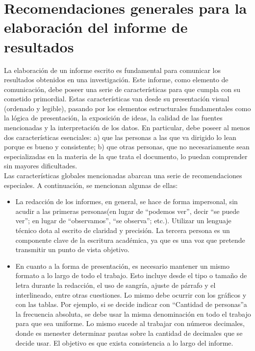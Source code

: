 \documentclass{../prob}
\begin{document}
\newpage

\section*{Recomendaciones generales para la elaboración del informe de resultados}
La  elaboración  de  un informe  escrito  es  fundamental  para  comunicar  los  resultados obtenidos  en  una  investigación. Este  informe, como  elemento  de  comunicación, debe poseer una serie de características para que cumpla con su cometido primordial. Estas características van   desde   su   presentación   visual   (ordenado   y   legible),   pasando   por   los   elementos estructurales fundamentales como la lógica  de presentación, la exposición de ideas, la calidad de  las  fuentes  mencionadas  y  la  interpretación  de  los  datos. En  particular, debe  poseer  al menos dos características esenciales: a) que  las personas a las que  va dirigido lo lean porque es  bueno y consistente; b) que  otras personas, que  no necesariamente sean especializadas  en la materia de la que trata el documento, lo puedan comprender sin mayores dificultades.\\

Las   características   globales   mencionadas   abarcan   una   serie   de   recomendaciones especiales. A continuación, se mencionan algunas de ellas:
\begin{itemize}
	\item La  redacción  de  los  informes,  en  general, se  hace  de  forma  impersonal,  sin acudir  a  las primeras  personas(en  lugar  de  \textquotedblleft podemos  ver\textquotedblright,  decir \textquotedblleft se  puede ver\textquotedblright ; en lugar de \textquotedblleft observamos\textquotedblright , \textquotedblleft se observa\textquotedblright ;  etc.). Utilizar un lenguaje técnico dota  al  escrito  de  claridad  y  precisión. La  tercera  persona  es  un  componente clave de  la  escritura académica,  ya que es  una voz  que pretende  transmitir un punto de vista objetivo.
	\item En cuanto a la forma de presentación, es necesario mantener un mismo formato a  lo  largo  de  todo  el  trabajo.  Esto  incluye  desde  el  tipo  o  tamaño  de  letra durante  la  redacción,  el  uso  de  sangría,  ajuste  de  párrafo  y  el  interlineado, entre otras cuestiones. Lo mismo debe ocurrir con los gráficos y con las tablas. Por  ejemplo,  si  se  decide  indicar  con  \textquotedblleft Cantidad  de  personas\textquotedblright  a  la  frecuencia absoluta,  se debe usar la misma denominación en todo el trabajo para que  sea uniforme.  Lo  mismo  sucede  al  trabajar  con  números  decimales,  donde  es menester determinar pautas sobre la cantidad de decimales que se decide usar. El objetivo es que exista consistencia a lo largo del informe.
\end{itemize}
\end{document}
